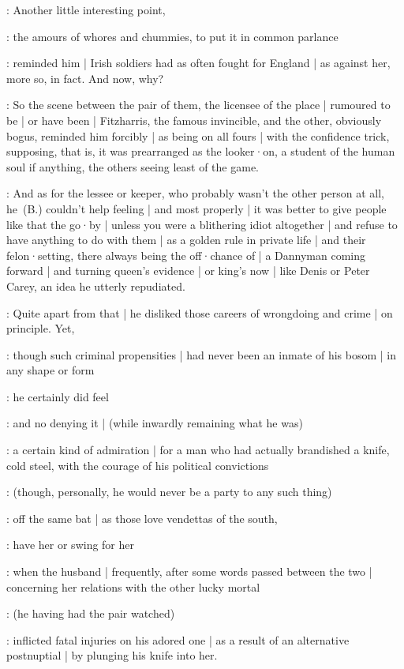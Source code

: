 :
Another little interesting point,

:
the amours of whores and chummies,
to put it in common parlance

:
reminded him |
Irish soldiers had as often fought for England |
as against her,
more so,
in fact.
And now,
why?

:
So the scene between the pair of them,
the licensee of the place |
rumoured to be |
or have been |
Fitzharris,
the famous invincible,
and the other,
obviously bogus,
reminded him forcibly |
as being on all fours |
with the confidence trick,
supposing,
that is,
it was prearranged as the looker·on,
a student of the human soul if anything,
the others seeing least of the game.

:
And as for the lessee or keeper,
who probably wasn't the other person at all,
he~(B.) couldn't help feeling |
and most properly |
it was better to give people like that the go·by |
unless you were a blithering idiot altogether |
and refuse to have anything to do with them |
as a golden rule in private life |
and their felon·setting,
there always being the off·chance of |
a Dannyman coming forward |
and turning queen's evidence |
or king's now |
like Denis or Peter Carey,
an idea he utterly repudiated.

:
Quite apart from that |
he disliked those careers of wrongdoing and crime |
on principle.
Yet,

:
though such criminal propensities |
had never been an inmate of his bosom |
in any shape or form

:
he certainly did feel

:
and no denying it |
(while inwardly remaining what he was)

:
a certain kind of admiration |
for a man who had actually brandished a knife,
cold steel,
with the courage of his political convictions

:
(though,
personally,
he would never be a party to any such thing)%

:
off the same bat |
as those love vendettas of the south,

:
have her or swing for her

:
when the husband |
frequently,
after some words passed between the two |
concerning her relations with the other lucky mortal

:
(he having had the pair watched)

:
inflicted fatal injuries on his adored one |
as a result of an alternative postnuptial  |
by plunging his knife into her.

